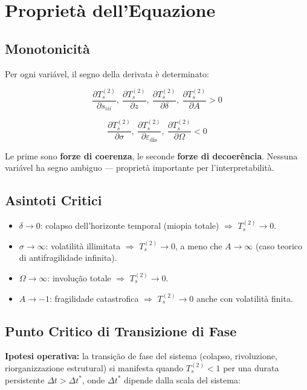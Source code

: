 \section{Proprietà dell'Equazione}\label{proprietuxe0-dellequação}

\subsection{Monotonicità}\label{monotonicituxe0}

\Proved{} Per ogni variável, il segno della derivata è determinato:

\[
\frac{\partial T_s^{(2)}}{\partial s_{iii}},\ \frac{\partial T_s^{(2)}}{\partial z},\ \frac{\partial T_s^{(2)}}{\partial \delta},\ \frac{\partial T_s^{(2)}}{\partial A} > 0
\]

\[
\frac{\partial T_s^{(2)}}{\partial \sigma},\ \frac{\partial T_s^{(2)}}{\partial \varepsilon_{\text{dis}}},\ \frac{\partial T_s^{(2)}}{\partial \Omega} < 0
\]

Le prime sono \textbf{forze di coerenza}, le seconde \textbf{forze di
decoerência}. Nessuna variável ha segno ambiguo --- proprietà importante
per l'interpretabilità.

\subsection{Asintoti Critici}\label{asintoti-critici}

\begin{itemize}
\tightlist
\item
  \(\delta \to 0\): colapso dell'horizonte temporal (miopia totale) $\Rightarrow$
  \(T_s^{(2)} \to 0\).
\item
  \(\sigma \to \infty\): volatilità illimitata $\Rightarrow$ \(T_s^{(2)} \to 0\), a
  meno che \(A \to \infty\) (caso teorico di antifragilidade infinita).
\item
  \(\Omega \to \infty\): involução totale $\Rightarrow$ \(T_s^{(2)} \to 0\).
\item
  \(A \to -1\): fragilidade catastrofica $\Rightarrow$ \(T_s^{(2)} \to 0\) anche con
  volatilità finita.
\end{itemize}

\subsection{Punto Critico di Transizione di
Fase}\label{punto-critico-di-transizione-di-fase}

\Hypoth{} \textbf{Ipotesi operativa:} la transição de fase del sistema
(colapso, rivoluzione, riorganizzazione estrutural) si manifesta
quando \(T_s^{(2)} < 1\) per una durata persistente
\(\Delta t > \Delta t^*\), onde \(\Delta t^*\) dipende dalla scala del
sistema:

